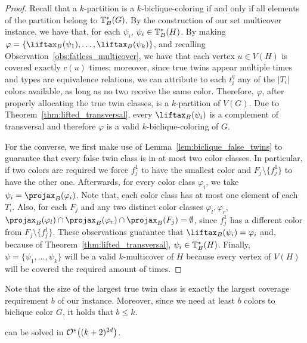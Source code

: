\begin{proof}
    Recall that a $k$-partition is a $k$-biclique-coloring if and only if all elements of the partition belong to $\mathbb{T}^*_{B}(G)$. By the construction of our set multicover instance, we have that, for each $\psi_i$, $\psi_i \in \mathbb{T}^*_{B}(H)$. By making $\varphi = \left\{\Lift{B}(\psi_1), \dots, \Lift{B}(\psi_k)\right\}$, and recalling Observation~\ref{obs:fatless_multicover}, we have that each vertex $u \in V(H)$ is covered exactly $c(u)$ times; moreover, since true twins appear multiple times and types are equivalence relations, we can attribute to each $t_i^q$ any of the $|T_i|$ colors available, as long as no two receive the same color.
    Therefore, $\varphi$, after properly allocating the true twin classes, is a $k$-partition of $V(G)$.
    Due to Theorem~\ref{thm:lifted_transversal}, every $\Lift{B}(\psi_i)$ is a complement of transversal and therefore $\varphi$ is a valid $k$-biclique-coloring of $G$.
    
    For the converse, we first make use of Lemma~\ref{lem:biclique_false_twins} to guarantee that every false twin class is in at most two color classes. In particular, if two colors are required we force $f_j^1$ to have the smallest color and $F_j \setminus \{f_j^1\}$ to have the other one.
    Afterwards, for every color class $\varphi_i$, we take $\psi_i = \Proj{B}(\varphi_i)$.
    Note that, each color class has at most one element of each $T_i$. Also, for each $F_j$ and any two distinct color classes $\varphi_l, \varphi_r$, $\Proj{B}(\varphi_l) \cap \Proj{B}(\varphi_r) \cap \Proj{B}(F_j) = \emptyset$, since $f_j^1$ has a different color from $F_j \setminus \{f_j^1\}$.
    These observations guarantee that $\Lift{B}(\psi_i) = \varphi_i$ and, because of Theorem~\ref{thm:lifted_transversal}, $\psi_i \in \mathbb{T}^*_{B}(H)$.
    Finally, $\psi = \{\psi_1, \dots, \psi_k\}$ will be a valid $k$-multicover of $H$ because every vertex of $V(H)$ will be covered the required amount of times.
\end{proof}

Note that the size of the largest true twin class is exactly the largest coverage requirement $b$ of our  instance.
Moreover, since we need at least $b$ colors to biclique color $G$, it holds that $b \leq k$.

\begin{theorem}
    \label{thm:fpt_biclique}
     can be solved in $\mathcal{O}^*\!\left((k+2)^{2d}\right)$.
\end{theorem}

